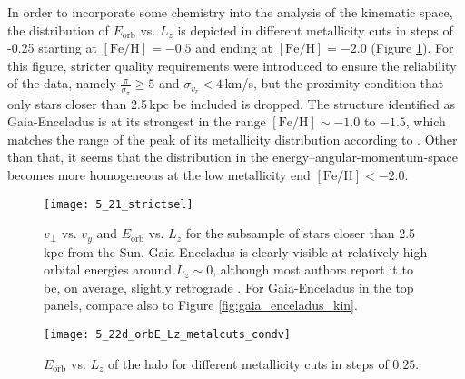 \documentclass[a4paper,11pt]{article}
\begin{document}
%
In order to incorporate some chemistry into the analysis of the kinematic space, the distribution of $E_\mathrm{orb}$ vs. $L_z$ is depicted in different metallicity cuts in steps of -0.25 starting at $\mathrm{[Fe/H]}=-0.5$ and ending at $\mathrm{[Fe/H]}=-2.0$ (Figure \ref{fig:kin_metalcuts}). For this figure, stricter quality requirements were introduced to ensure the reliability of the data, namely $\frac{\pi}{\sigma_\pi}\geq5$ and $\sigma_{v_r}<4$\,km/s, but the proximity condition that only stars closer than 2.5\,kpc be included is dropped. The structure identified as Gaia-Enceladus is at its strongest in the range $\mathrm{[Fe/H]}\sim-1.0$ to $-1.5$, which matches the range of the peak of its metallicity distribution according to \citet{ruizlara22}. Other than that, it seems that the distribution in the energy--angular-momentum-space becomes more homogeneous at the low metallicity end $\mathrm{[Fe/H]}<-2.0$.
%
\begin{figure}[H]
 \begin{minipage}[t]{\textwidth}
  \centering
  \texttt{[image: 5\_21\_strictsel]}
  \caption[Distribution in kinematic space for strict selection]{$v_\perp$ vs. $v_y$ and $E_\mathrm{orb}$ vs. $L_z$ for the subsample of stars closer than 2.5\,kpc from the Sun. Gaia-Enceladus is clearly visible at relatively high orbital energies around $L_z\sim0$, although most authors report it to be, on average, slightly retrograde \citep[e.g.,][]{helmi18}. For Gaia-Enceladus in the top panels, compare also to Figure \ref{fig:gaia_enceladus_kin}.}
  \label{fig:kin_strictsel}
 \end{minipage}\vspace{0.4cm}
 \begin{minipage}[t]{\textwidth}
  \centering
  \texttt{[image: 5\_22d\_orbE\_Lz\_metalcuts\_condv]}
  \caption[$E_\mathrm{orb}$ vs. $L_z$ in different metallicity cuts]{$E_\mathrm{orb}$ vs. $L_z$ of the halo for different metallicity cuts in steps of $0.25$.}
  \label{fig:kin_metalcuts}
 \end{minipage}
\end{figure}
%
\noindent
\end{document}
